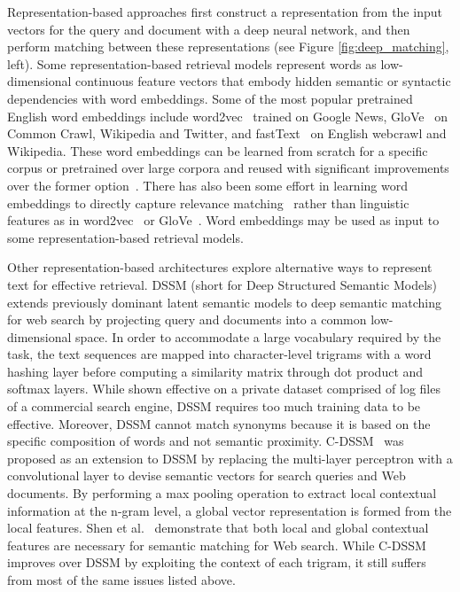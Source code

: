 Representation-based approaches first construct a representation from the input vectors for the query and document with a deep neural network, and then perform matching between these representations (see Figure \ref{fig:deep_matching}, left).
Some representation-based retrieval models represent words as low-dimensional continuous feature vectors that embody hidden semantic or syntactic dependencies with word embeddings.
Some of the most popular pretrained English word embeddings include word2vec~\cite{mikolov2013distributed} trained on  Google News, GloVe~\cite{pennington2014glove} on Common Crawl, Wikipedia and Twitter, and fastText~\cite{bojanowski2017enriching} on English webcrawl and Wikipedia.
These word embeddings can be learned from scratch for a specific corpus or pretrained over large corpora and reused with significant improvements over the former option~\cite{turian2010word}.
There has also been some effort in learning word embeddings to directly capture relevance matching~\cite{DBLP:journals/corr/ZamaniC17, ganguly2015word} rather than linguistic features as in word2vec~\cite{mikolov2013distributed} or GloVe~\cite{pennington2014glove}.
Word embeddings may be used as input to some representation-based retrieval models.

Other representation-based architectures explore alternative ways to represent text for effective retrieval.
DSSM (short for Deep Structured Semantic Models)~\cite{huang2013learning} extends previously dominant latent semantic models to deep semantic matching for web search by projecting query and documents into a common low-dimensional space.
In order to accommodate a large vocabulary required by the task, the text sequences are mapped into character-level trigrams with a word hashing layer before computing a similarity matrix through dot product and softmax layers.
While shown effective on a private dataset comprised of log files of a commercial search engine, DSSM requires too much training data to be effective.
Moreover, DSSM cannot match synonyms because it is based on the specific composition of words and not semantic proximity.
C-DSSM~\cite{shen2014learning} was proposed as an extension to DSSM by replacing the multi-layer perceptron with a convolutional layer to devise semantic vectors for search queries and Web documents.
By performing a max pooling operation to extract local contextual information at the n-gram level, a global vector representation is formed from the local features.
Shen et al.~\cite{shen2014learning} demonstrate that both local and global contextual features are necessary for semantic matching for Web search.
While C-DSSM improves over DSSM by exploiting the context of each trigram, it still suffers from most of the same issues listed above.

